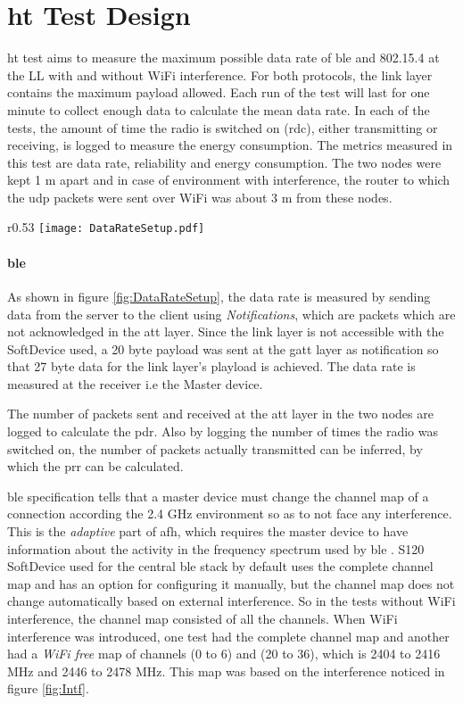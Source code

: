 \section{\acrfull{ht} Test Design} \label{6HTdesign}
\gls{ht} test aims to measure the maximum possible data rate of \gls{ble} and 802.15.4 at the LL with and without WiFi interference. For both protocols, the link layer contains the maximum payload allowed. Each run of the test will last for one minute to collect enough data to calculate the mean data rate. In each of the tests, the amount of time the radio is switched on (\gls{rdc}), either transmitting or receiving, is logged to measure the energy consumption. The metrics measured in this test are data rate, reliability and energy consumption. The two nodes were kept 1 m apart and in case of environment with interference, the router to which the \gls{udp} packets were sent over WiFi was about 3 m from these nodes.

\begin{wrapfigure}{r}{0.53\textwidth}
	\vspace{-15pt}
	\centering
	\texttt{[image: DataRateSetup.pdf]}
	\caption{Setup to measure data rate with \gls{ble}}
    \label{fig:DataRateSetup}
   	\vspace{-15pt}
\end{wrapfigure}

\paragraph{\gls{ble} } As shown in figure \ref{fig:DataRateSetup}, the data rate is measured by sending data from the server to the client using \emph{Notifications}, which are packets which are not acknowledged in the \gls{att} layer. Since the link layer is not accessible with the SoftDevice used, a 20 byte payload was sent at the \gls{gatt} layer as notification so that 27 byte data for the link layer's playload is achieved. The data rate is measured at the receiver i.e the Master device. 

The number of packets sent and received at the \gls{att} layer in the two nodes are logged to calculate the \gls{pdr}. Also by logging the number of times the radio was switched on, the number of packets actually transmitted can be inferred, by which the \gls{prr} can be calculated.

\gls{ble}  specification tells that a master device must change the channel map of a connection according the 2.4 GHz environment so as to not face any interference. This is the \emph{adaptive} part of \gls{afh}, which requires the master device to have information about the activity in the frequency spectrum used by \gls{ble} . S120 SoftDevice used for the central \gls{ble}  stack by default uses the complete channel map and has an option for configuring it manually, but the channel map does not change automatically based on external interference. So in the tests without WiFi interference, the channel map consisted of all the channels. When WiFi interference was introduced, one test had the complete channel map and another had a \emph{WiFi free} map of channels (0 to 6) and (20 to 36), which is 2404 to 2416 MHz and 2446 to 2478 MHz. This map was based on the interference noticed in figure \ref{fig:Intf}.

